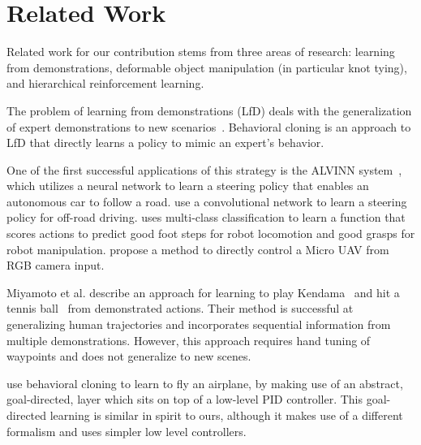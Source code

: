 \section{Related Work}


Related work for our contribution stems from three areas of research:
learning from demonstrations, deformable object manipulation (in particular
knot tying), and hierarchical reinforcement learning.

The problem of learning from demonstrations (LfD) deals with the generalization of expert demonstrations to 
new scenarios~\cite{Argall_2009, Schaal_1999}. Behavioral cloning is an approach to LfD that 
directly learns a policy to mimic an expert's behavior.

One of the first successful applications of this strategy is the ALVINN system~\cite{Pomerleau_NIPS1989}, which utilizes a 
neural network to learn a steering policy that enables an autonomous car to follow a road.
\citet{muller2005off} use a convolutional network to learn a steering policy for off-road driving.
\citet{Ratliff_Humanoids2007} uses multi-class classification to learn a function that scores actions 
to predict good foot steps for robot locomotion and good grasps for robot manipulation.
\citet{Ross_2013} propose a method to directly control a Micro UAV from RGB camera input.

Miyamoto et al. describe an approach for learning to play Kendama~\cite{Miyamoto_1996} and hit a 
tennis ball~\cite{Miyamoto_1998} from demonstrated actions. 
Their method is successful at generalizing human trajectories and incorporates sequential information 
from multiple demonstrations.
However, this approach requires hand tuning of waypoints and does not generalize to new scenes.

\citet{Isaac_ICML2003} use behavioral cloning to learn to fly an airplane, by making use of an abstract, 
goal-directed, layer which sits on top of a low-level PID controller.
This goal-directed learning is similar in spirit to ours, although it makes use of a different formalism
and uses simpler low level controllers.

